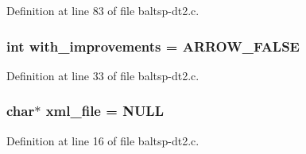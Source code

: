 Definition at line 83 of file baltsp-dt2.c.\hypertarget{bin_2baltsp-dt2_8c_91079460b00ac08193d5ee47094f8f70}{
\subsubsection[{with\_\-improvements}]{\setlength{\rightskip}{0pt plus 5cm}int {\bf with\_\-improvements} = ARROW\_\-FALSE}}
\label{bin_2baltsp-dt2_8c_91079460b00ac08193d5ee47094f8f70}




Definition at line 33 of file baltsp-dt2.c.\hypertarget{bin_2baltsp-dt2_8c_bf4e392494984c6ef8259268eb1fe421}{
\subsubsection[{xml\_\-file}]{\setlength{\rightskip}{0pt plus 5cm}char$\ast$ {\bf xml\_\-file} = NULL}}
\label{bin_2baltsp-dt2_8c_bf4e392494984c6ef8259268eb1fe421}




Definition at line 16 of file baltsp-dt2.c.